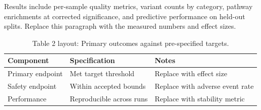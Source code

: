 
Results include per-sample quality metrics, variant counts by category, pathway enrichments at corrected significance, and predictive performance on held-out splits. Replace this paragraph with the measured numbers and effect sizes.

\begin{table}[H]
\caption{Table 2 layout: Primary outcomes against pre-specified targets.}
\label{tab:results_primary}
\centering
\begin{tabular}{>{\raggedright\arraybackslash}p{3.4cm} >{\raggedright\arraybackslash}p{4.6cm} >{\raggedright\arraybackslash}p{5.4cm}}
\toprule
\textbf{Component} & \textbf{Specification} & \textbf{Notes} \\
\midrule
  Primary endpoint & Met target threshold & Replace with effect size \\
  Safety endpoint & Within accepted bounds & Replace with adverse event rate \\
  Performance & Reproducible across runs & Replace with stability metric \\
\bottomrule
\end{tabular}
\end{table}
